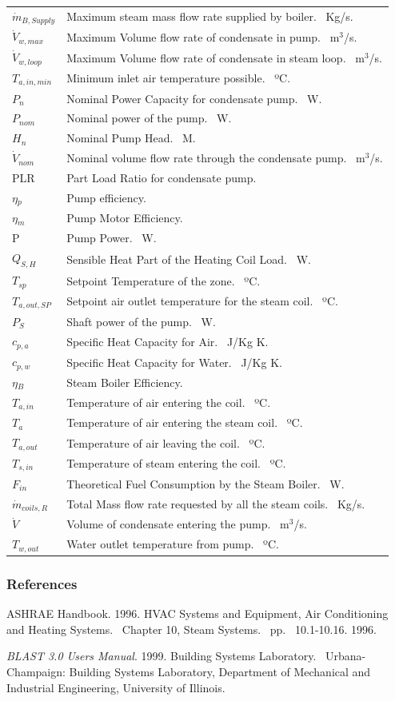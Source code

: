 \begin{longtable}[c]{p{1.0in}p{4.0in}}
\(\dot m_{B,Supply}\) & Maximum steam mass flow rate supplied by boiler.~ Kg/s. \tabularnewline
\(\dot V_{w,max}\) & Maximum Volume flow rate of condensate in pump.~ m\(^3\)/s. \tabularnewline
\(\dot V_{w,loop}\) & Maximum Volume flow rate of condensate in steam loop.~ m\(^3\)/s. \tabularnewline
\(T_{a,in,min}\) & Minimum inlet air temperature possible.~ ºC. \tabularnewline
\(P_{n}\) & Nominal Power Capacity for condensate pump.~ W. \tabularnewline
\(P_{nom}\) & Nominal power of the pump.~ W. \tabularnewline
\(H_{n}\) & Nominal Pump Head.~ M. \tabularnewline
\(\dot V_{nom}\) & Nominal volume flow rate through the condensate pump.~ m\(^3\)/s. \tabularnewline
PLR & Part Load Ratio for condensate pump. \tabularnewline
\(\eta\)\(_{p}\) & Pump efficiency. \tabularnewline
\(\eta\)\(_{m}\) & Pump Motor Efficiency. \tabularnewline
P & Pump Power.~ W. \tabularnewline
\(Q_{S,H}\) & Sensible Heat Part of the Heating Coil Load.~ W. \tabularnewline
\(T_{sp}\) & Setpoint Temperature of the zone.~ ºC. \tabularnewline
\(T_{a,out,SP}\) & Setpoint air outlet temperature for the steam coil.~ ºC. \tabularnewline
\(P_{S}\) & Shaft power of the pump.~ W. \tabularnewline
\(c_{p,a}\) & Specific Heat Capacity for Air.~ J/Kg K. \tabularnewline
\(c_{p,w}\) & Specific Heat Capacity for Water.~ J/Kg K. \tabularnewline
\(\eta\)\(_{B}\) & Steam Boiler Efficiency. \tabularnewline
\(T_{a,in}\) & Temperature of air entering the coil.~ ºC. \tabularnewline
\(T_{a}\) & Temperature of air entering the steam coil.~ ºC. \tabularnewline
\(T_{a,out}\) & Temperature of air leaving the coil.~ ºC. \tabularnewline
\(T_{s,in}\) & Temperature of steam entering the coil.~ ºC. \tabularnewline
\(F_{in}\) & Theoretical Fuel Consumption by the Steam Boiler.~ W. \tabularnewline
\(\dot m_{coils,R}\) & Total Mass flow rate requested by all the steam coils.~ Kg/s. \tabularnewline
\(\dot V\) & Volume of condensate entering the pump.~ m\(^3\)/s. \tabularnewline
\(T_{w,out}\) & Water outlet temperature from pump.~ ºC. \tabularnewline
\bottomrule
\end{longtable}

\subsubsection{References}\label{references-007}

ASHRAE Handbook. 1996. HVAC Systems and Equipment, Air Conditioning and Heating Systems.~ Chapter 10, Steam Systems.~ pp.\emph{~} 10.1-10.16. 1996.

\emph{BLAST 3.0 Users Manual}. 1999. Building Systems Laboratory.~ Urbana-Champaign: Building Systems Laboratory, Department of Mechanical and Industrial Engineering, University of Illinois.

